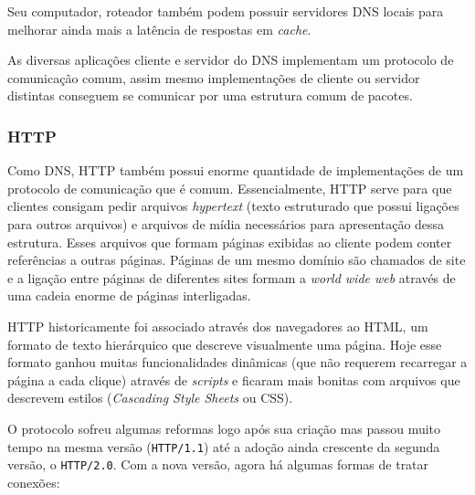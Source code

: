 \documentclass[brazilian,a4paper,twocolumn]{article}
\begin{document}
Seu computador, roteador também podem possuir servidores DNS locais para melhorar ainda mais a latência de respostas em \textit{cache}.

As diversas aplicações cliente e servidor do DNS implementam um protocolo de comunicação comum, assim mesmo implementações de cliente ou servidor distintas conseguem se comunicar por uma estrutura comum de pacotes.

\subsubsection{HTTP}

Como DNS, HTTP também possui enorme quantidade de implementações de um protocolo de comunicação que é comum. Essencialmente, HTTP serve para que clientes consigam pedir arquivos \textit{hypertext} (texto estruturado que possui ligações para outros arquivos) e arquivos de mídia necessários para apresentação dessa estrutura. Esses arquivos que formam páginas exibidas ao cliente podem conter referências a outras páginas. Páginas de um mesmo domínio são chamados de site e a ligação entre páginas de diferentes sites formam a \textit{world wide web} através de uma cadeia enorme de páginas interligadas.

HTTP historicamente foi associado através dos navegadores ao HTML, um formato de texto hierárquico que descreve visualmente uma página. Hoje esse formato ganhou muitas funcionalidades dinâmicas (que não requerem recarregar a página a cada clique) através de \textit{scripts} e ficaram mais bonitas com arquivos que descrevem estilos (\textit{Cascading Style Sheets} ou CSS).

O protocolo sofreu algumas reformas logo após sua criação mas passou muito tempo na mesma versão (\texttt{HTTP/1.1}) até a adoção ainda crescente da segunda versão, o \texttt{HTTP/2.0}. Com a nova versão, agora há algumas formas de tratar conexões:
\end{document}
